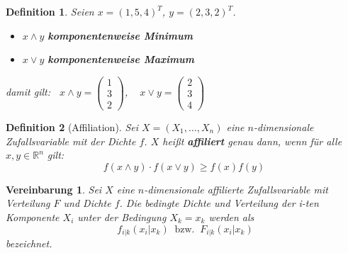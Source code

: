 \documentclass[12pt]{extreport} %
\theoremstyle{named}
\theoremstyle{nnamed}
\theoremstyle{itshape}
\newtheorem*{definition}{Definition}
\theoremstyle{normal}
\newtheorem*{vereinbarung}{Vereinbarung}
\begin{document}
 
\begin{definition}
	Seien $x = \left( 1, 5, 4 \right)^{T}$, $y = \left( 2, 3, 2 \right)^{T}$.
	\begin{itemize}
		\item $x \wedge y$ \textbf{komponentenweise Minimum}
		\item $x \vee y$ \textbf{komponentenweise Maximum}
	\end{itemize}
	damit gilt: $~$ $x \wedge y = \left(\begin{array}{c} 1 \\ 3 \\ 2 \end{array}\right)$, ~ $x \vee y = \left(\begin{array}{c} 2 \\ 3 \\ 4 \end{array}\right) $
\end{definition}

\begin{definition}[Affiliation]
	Sei $X = (X_{1}, \dotsc, X_{n})$ eine $n$-dimensionale Zufallsvariable mit der Dichte $f$. $X$ hei{\ss}t \textbf{affiliert} genau dann, wenn für alle $x, y \in \mathbb{R}^{n}$ gilt:
		$$ f(x \wedge y ) \cdot f(x \vee y) \geq f(x) f(y) $$	
\end{definition}

\begin{vereinbarung}
	Sei $X$ eine $n$-dimensionale affilierte Zufallsvariable mit Verteilung $F$ und Dichte $f$. Die bedingte Dichte und Verteilung der i-ten Komponente $X_{i}$ unter der Bedingung $X_{k} = x_{k}$ werden als
	$$ ~ f_{i|k}(x_{i}|x_{k}) ~ \text{ bzw. } ~ F_{i|k}(x_{i}|x_{k}) $$
	bezeichnet. 
\end{vereinbarung}
\end{document}
